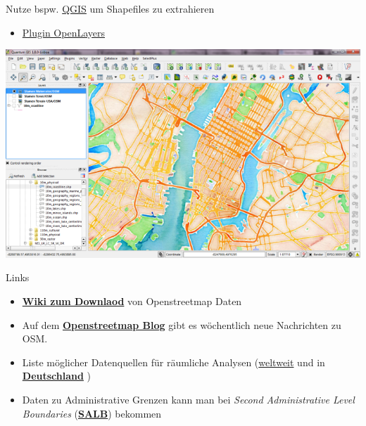 \documentclass[ignorenonframetext,]{beamer}
\providecommand{\tightlist}{%
  \setlength{\itemsep}{0pt}\setlength{\parskip}{0pt}}
\begin{document}
\begin{frame}{Nutze bspw. \href{http://www.qgis.org/de/site/}{QGIS} um
Shapefiles zu extrahieren}
\protect\hypertarget{nutze-bspw.-qgis-um-shapefiles-zu-extrahieren}{}

\begin{itemize}
\tightlist
\item
  \href{http://www.qgistutorials.com/de/docs/downloading_osm_data.html}{Plugin
  OpenLayers}
\end{itemize}

\includegraphics{figure/stamen_watercolor1.png}

\end{frame}

\begin{frame}{Links}
\protect\hypertarget{links}{}

\begin{itemize}
\item
  \href{http://wiki.openstreetmap.org/wiki/Downloading_data}{\textbf{Wiki
  zum Downlaod}} von Openstreetmap Daten
\item
  Auf dem \href{http://blog.openstreetmap.de/}{\textbf{Openstreetmap
  Blog}} gibt es wöchentlich neue Nachrichten zu OSM.
\item
  Liste möglicher Datenquellen für räumliche Analysen
  (\href{http://wiki.openstreetmap.org/wiki/Potential_Datasources}{weltweit}
  und in
  \href{http://wiki.openstreetmap.org/wiki/DE:Potential_Datasources}{\textbf{Deutschland}}
  )
\item
  Daten zu Administrative Grenzen kann man bei \emph{Second
  Administrative Level Boundaries}
  (\href{http://wiki.openstreetmap.org/wiki/SALB}{\textbf{SALB}})
  bekommen
\end{itemize}

\end{frame}
\end{document}
